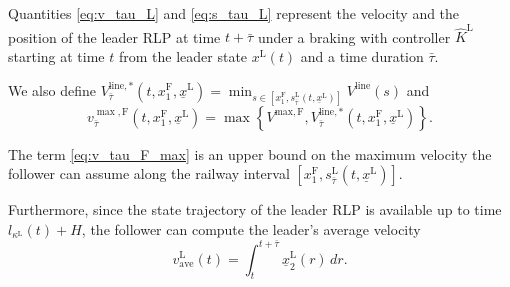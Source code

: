 \documentclass[letterpaper, 10 pt, conference]{ieeeconf}
\theoremstyle{definition}
\theoremstyle{nopoint}
\begin{document}
Quantities \eqref{eq:v_tau_L} and \eqref{eq:s_tau_L} represent the velocity and the position of the leader RLP at time $t+\bar{\tau}$ under a braking with controller $\hat{K}^\mathrm{L}$ starting at time $t$  from the leader state $x^\mathrm{L}(t)$ and a time duration $\bar{\tau}$. 


We also define  $V_{\bar{\tau}}^{\mathrm{line},*}(t,x_1^\mathrm{F},\underline{x}^\mathrm{L})=\min_{s\in \left[x_1^\mathrm{F} ,s_{\bar{\tau}}^\mathrm{L}\left(t,\underline{x}^\mathrm{L}\right)\right]} V^{\mathrm{line}}(s)$
and 
\begin{equation}\label{eq:v_tau_F_max}
v_{\bar{\tau}}^{\max, \mathrm{F}}\left( t,x_1^\mathrm{F},\underline{x}^\mathrm{L} \right)=\max\left\{V^{\mathrm{max},\mathrm{F}},V_{\bar{\tau}}^{\mathrm{line},*}(t,x_1^\mathrm{F},\underline{x}^\mathrm{L})\right\}.
\end{equation}

The term \eqref{eq:v_tau_F_max} is an upper bound on the maximum velocity the follower can assume along the railway interval $\left[x_1^\mathrm{F} ,s_{\bar{\tau}}^\mathrm{L}\left(t,\underline{x}^\mathrm{L}\right)\right]$.

Furthermore, since the state trajectory of the leader RLP is available up to time $l_{\kappa^\mathrm{L}}(t)+H$, the follower can compute the leader's average velocity
\begin{equation}\label{eq:average_velocity}
v_{\mathrm{ave}}^\mathrm{L}(t)=\int_{t}^{t+\bar{\tau}} \underline{x}_2^\mathrm{L}(r)\, dr.
\end{equation} 
\end{document}
